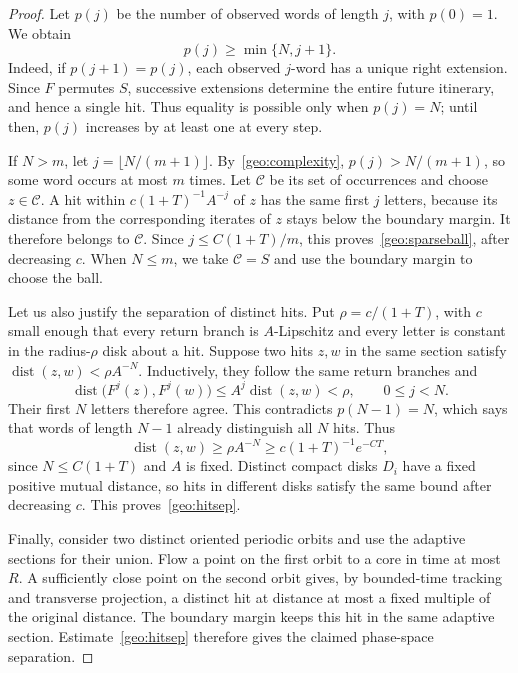 \documentclass[10pt,oneside,reqno]{amsproc}
\numberwithin{equation}{section}
\theoremstyle{definition}
\theoremstyle{remark}
\DeclareMathOperator{\dist}{dist}
\renewcommand{\ge}{\geqslant}
\renewcommand{\le}{\leqslant}
\begin{document}
\begin{proof}
Let $p(j)$ be the number of observed words of length $j$, with $p(0)=1$. We obtain
\begin{equation}
 p(j)\ge\min\{N,j+1\}.
 \label{geo:complexity}
\end{equation}
Indeed, if $p(j+1)=p(j)$, each observed $j$-word has a unique right extension. Since $F$ permutes $S$, successive extensions determine the entire future itinerary, and hence a single hit. Thus equality is possible only when $p(j)=N$; until then, $p(j)$ increases by at least one at every step.

If $N>m$, let $j=\lfloor N/(m+1)\rfloor$. By~\eqref{geo:complexity}, $p(j)>N/(m+1)$, so some word occurs at most $m$ times. Let $\mathcal C$ be its set of occurrences and choose $z\in\mathcal C$. A hit within $c(1+T)^{-1}A^{-j}$ of $z$ has the same first $j$ letters, because its distance from the corresponding iterates of $z$ stays below the boundary margin. It therefore belongs to $\mathcal C$. Since $j\le C(1+T)/m$, this proves~\eqref{geo:sparseball}, after decreasing $c$. When $N\le m$, we take $\mathcal C=S$ and use the boundary margin to choose the ball.

Let us also justify the separation of distinct hits. Put $\rho=c/(1+T)$, with $c$ small enough that every return branch is $A$-Lipschitz and every letter is constant in the radius-$\rho$ disk about a hit. Suppose two hits $z,w$ in the same section satisfy $\dist(z,w)<\rho A^{-N}$. Inductively, they follow the same return branches and
\[
 \dist\bigl(F^j(z),F^j(w)\bigr)\le A^j\dist(z,w)<\rho,\qquad 0\le j<N.
\]
Their first $N$ letters therefore agree. This contradicts $p(N-1)=N$, which says that words of length $N-1$ already distinguish all $N$ hits. Thus
\[
 \dist(z,w)\ge\rho A^{-N}\ge c(1+T)^{-1}e^{-CT},
\]
since $N\le C(1+T)$ and $A$ is fixed. Distinct compact disks $D_i$ have a fixed positive mutual distance, so hits in different disks satisfy the same bound after decreasing $c$. This proves~\eqref{geo:hitsep}.

Finally, consider two distinct oriented periodic orbits and use the adaptive sections for their union. Flow a point on the first orbit to a core in time at most $R$. A sufficiently close point on the second orbit gives, by bounded-time tracking and transverse projection, a distinct hit at distance at most a fixed multiple of the original distance. The boundary margin keeps this hit in the same adaptive section. Estimate~\eqref{geo:hitsep} therefore gives the claimed phase-space separation.
\end{proof}
\end{document}
